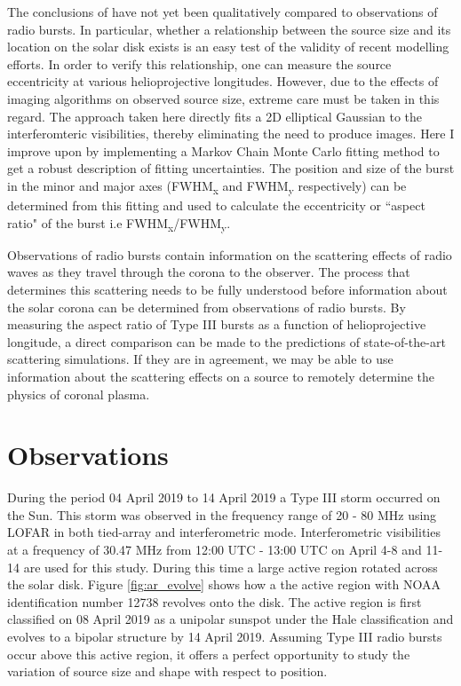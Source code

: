 The conclusions of \cite{Kontar2019} have not yet been qualitatively compared to observations of radio bursts. In particular, whether a relationship between the source size and its location on the solar disk exists is an easy test of the validity of recent modelling efforts. In order to verify this relationship, one can measure the source eccentricity at various helioprojective longitudes. However, due to the effects of imaging algorithms on observed source size, extreme care must be taken in this regard. The approach taken here directly fits a 2D elliptical Gaussian to the interferomteric visibilities, thereby eliminating the need to produce images. Here I improve upon \cite{Murphy2021} by implementing a Markov Chain Monte Carlo fitting method to get a robust description of fitting uncertainties. The position and size of the burst in the minor and major axes (FWHM\textsubscript{x} and FWHM\textsubscript{y} respectively) can be determined from this fitting and used to calculate the eccentricity or ``aspect ratio"  of the burst i.e FWHM\textsubscript{x}/FWHM\textsubscript{y}.

Observations of radio bursts contain information on the scattering effects of radio waves as they travel through the corona to the observer. The process that determines this scattering needs to be fully understood before information about the solar corona can be determined from observations of radio bursts.
By measuring the aspect ratio of Type III bursts as a function of helioprojective longitude, a direct comparison can be made to the predictions of state-of-the-art scattering simulations. If they are in agreement, we may be able to use information about the scattering effects on a source to remotely determine the physics of coronal plasma.

\section{Observations}
\label{obsvtheory_observations}
During the period 04 April 2019 to 14 April 2019 a Type III storm occurred on the Sun. This storm was observed in the frequency range of 20 - 80 MHz using LOFAR in both tied-array and interferometric mode. Interferometric visibilities at a frequency of 30.47 MHz from 12:00 UTC - 13:00 UTC on April 4-8 and 11-14 are used for this study. During this time a large active region rotated across the solar disk. Figure \ref{fig:ar_evolve} shows how a the active region with NOAA identification number 12738 revolves onto the disk. The active region is first classified on 08 April 2019 as a unipolar sunspot under the Hale classification and evolves to a bipolar structure by 14 April 2019. Assuming Type III radio bursts occur above this active region, it offers a perfect opportunity to study the variation of source size and shape with respect to position. 

